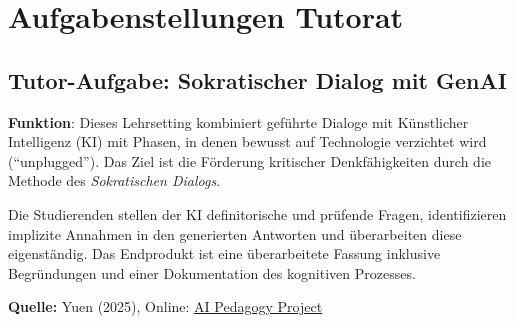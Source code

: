 \documentclass[
  ngerman,
  letterpaper,
  DIV=11]{scrreprt}
\begin{document}
\section{Aufgabenstellungen Tutorat}\label{aufgabenstellungen-tutorat}

\subsection{Tutor-Aufgabe: Sokratischer Dialog mit
GenAI}\label{sec-prompt-sokratischer-dialog}

\textbf{Funktion}: Dieses Lehrsetting kombiniert geführte Dialoge mit
Künstlicher Intelligenz (KI) mit Phasen, in denen bewusst auf
Technologie verzichtet wird (``unplugged''). Das Ziel ist die Förderung
kritischer Denkfähigkeiten durch die Methode des \emph{Sokratischen
Dialogs}.

Die Studierenden stellen der KI definitorische und prüfende Fragen,
identifizieren implizite Annahmen in den generierten Antworten und
überarbeiten diese eigenständig. Das Endprodukt ist eine überarbeitete
Fassung inklusive Begründungen und einer Dokumentation des kognitiven
Prozesses.

\textbf{Quelle:} Yuen (2025), Online:
\href{https://aipedagogy.org/assignment/questioning-the-bot-socratic-chats-with-ai-2/}{AI
Pedagogy Project}
\end{document}
